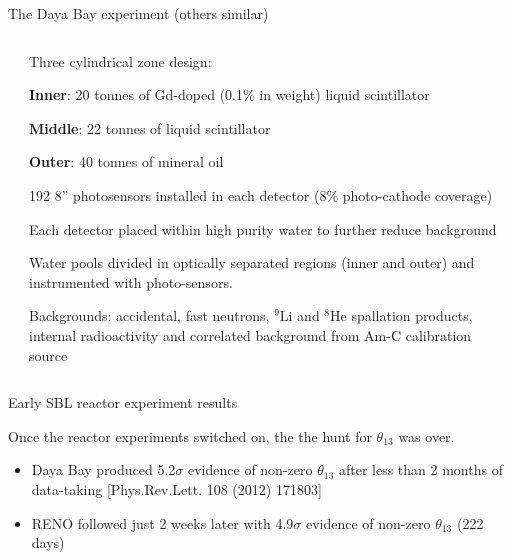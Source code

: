\begin{frame}{The Daya Bay experiment (others similar)}
\begin{columns}
\begin{column}{0.33\textwidth}
  \end{column}
  \begin{column}{0.66\textwidth}
    \begin{itemize}
    {\small
      \item Three cylindrical zone design:\\
        \begin{itemize}
        {\small
          \item {\bf Inner}: 20 tonnes of Gd-doped (0.1\% in weight) liquid scintillator
          \item {\bf Middle}: 22 tonnes of liquid scintillator
          \item {\bf Outer}: 40 tonnes of mineral oil
        }
        \end{itemize}
      \item 192 8'' photosensors installed in each detector (8\% photo-cathode coverage)
      \item Each detector placed within high purity water to further reduce background
      \item Water pools divided in optically separated regions (inner and outer) and instrumented with photo-sensors.
      \item Backgrounds: accidental, fast neutrons, $^{9}$Li and $^{8}$He spallation products,
            internal radioactivity and correlated background from Am-C calibration source
    }
    \end{itemize}
  \end{column}
\end{columns}
\end{frame}


%
%
%

\begin{frame}{Early SBL reactor experiment results}

Once the reactor experiments switched on, the the hunt for $\theta_{13}$ was over.

\begin{itemize}
  \item Daya Bay produced 5.2$\sigma$ evidence of non-zero $\theta_{13}$
        after less than 2 months of data-taking
        {\scriptsize \color{blue} [Phys.Rev.Lett. 108 (2012) 171803]}
  \item RENO followed just 2 weeks later with
        4.9$\sigma$ evidence of non-zero $\theta_{13}$ (222 days)
\end{itemize}

\end{frame}


